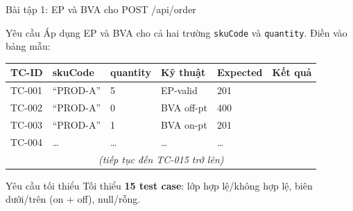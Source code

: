 \documentclass[aspectratio=169,12pt]{beamer}
\begin{document}
\begin{frame}[shrink=10]{Bài tập 1: EP và BVA cho POST /api/order}
  \begin{block}{Yêu cầu}
    Áp dụng EP và BVA cho cả hai trường \texttt{skuCode} và \texttt{quantity}.
    Điền vào bảng mẫu:
  \end{block}

  \vspace{0.1em}
  \begin{center}
  \scriptsize
  \setlength{\tabcolsep}{3pt}
  \begin{tabular}{p{1.3cm}p{1.7cm}p{1.6cm}p{1.8cm}p{1.4cm}p{1.3cm}}
    \toprule
    \textbf{TC-ID} & \textbf{skuCode} & \textbf{quantity} & \textbf{Kỹ thuật} & \textbf{Expected} & \textbf{Kết quả} \\
    \midrule
    TC-001 & ``PROD-A'' & 5 & EP-valid & 201 & \\
    TC-002 & ``PROD-A'' & 0 & BVA off-pt & 400 & \\
    TC-003 & ``PROD-A'' & 1 & BVA on-pt & 201 & \\
    TC-004 & \ldots & \ldots & \ldots & \ldots & \\
    \multicolumn{6}{c}{\textit{(tiếp tục đến TC-015 trở lên)}} \\
    \bottomrule
  \end{tabular}
  \end{center}

  \vspace{0.05em}
  \begin{alertblock}{Yêu cầu tối thiểu}
    \small Tối thiểu \textbf{15 test case}: lớp hợp lệ/không hợp lệ, biên dưới/trên (on + off), null/rỗng.
  \end{alertblock}
\end{frame}
\end{document}

